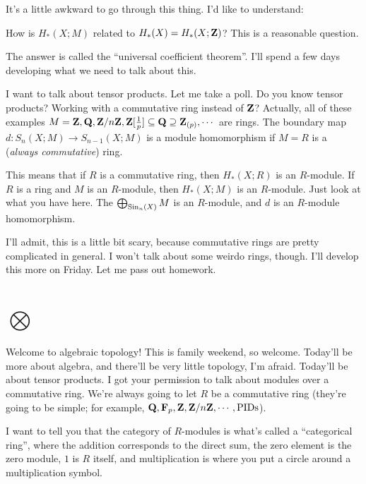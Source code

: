 It's a little awkward to go through this thing. I'd like to understand:
\begin{question}
How is $ H_\ast(X;M)$ related to $ H_\ast(X)= H_\ast(X;\mathbf Z)$? This is a reasonable question.
\end{question}
The answer is called the ``universal coefficient theorem''. I'll spend a few days developing what we need to talk about this.

I want to talk about tensor products. Let me take a poll. Do you know tensor products? Working with a commutative ring instead of $\mathbf Z$? Actually, all of these examples $M=\mathbf Z,\mathbf Q,\mathbf Z/n\mathbf Z,\mathbf Z[\frac{1}{p}]\subseteq\mathbf Q\supseteq\mathbf Z_{(p)},\cdots$ are rings. The boundary map $d:S_n(X;M)\to S_{n-1}(X;M)$ is a module homomorphism if $M=R$ is a (\emph{always commutative}) ring.

This means that if $R$ is a commutative ring, then $ H_\ast(X;R)$ is an $R$-module. If $R$ is a ring and $M$ is an $R$-module, then $ H_\ast(X;M)$ is an $R$-module. Just look at what you have here. The $\bigoplus_{\mathrm{Sin}_n(X)}M$ is an $R$-module, and $d$ is an $R$-module homomorphism.

I'll admit, this is a little bit scary, because commutative rings are pretty complicated in general. I won't talk about some weirdo rings, though. I'll develop this more on Friday. Let me pass out homework.
\section{$\bigotimes$}
Welcome to algebraic topology! This is family weekend, so welcome. Today'll be more about algebra, and there'll be very little topology, I'm afraid. Today'll be about tensor products. I got your permission to talk about modules over a commutative ring. We're always going to let $R$ be a commutative ring (they're going to be simple; for example, $\mathbf Q,\mathbf F_p,\mathbf Z,\mathbf Z/n\mathbf Z,\cdots,\text{PIDs}$).

I want to tell you that the category of $R$-modules is what's called a ``categorical ring'', where the addition corresponds to the direct sum, the zero element is the zero module, $1$ is $R$ itself, and multiplication is where you put a circle around a multiplication symbol.

